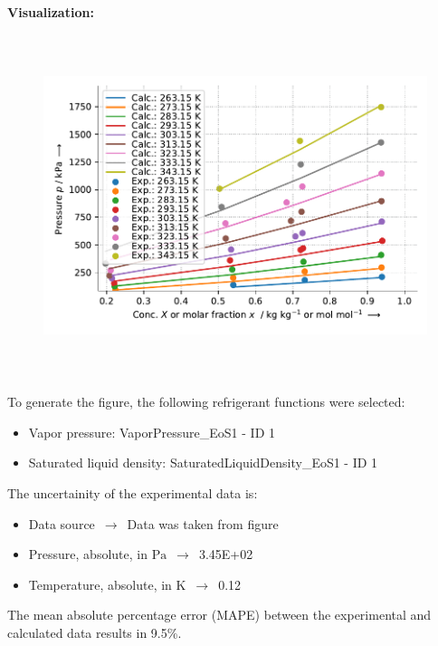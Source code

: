 \textbf{Visualization:}
%
\begin{figure}[!htp]
{\noindent\includegraphics[height=10cm, keepaspectratio]{figs/abs/abs_R-12_naphthenic__NrtlFixedDg_1.pdf}}
\end{figure}
%

To generate the figure, the following refrigerant functions were selected:
\begin{itemize}
\item Vapor pressure: VaporPressure\_EoS1 - ID 1
\item Saturated liquid density: SaturatedLiquidDensity\_EoS1 - ID 1
\end{itemize}

The uncertainity of the experimental data is:
\begin{itemize}
\item Data source $\,\to\,$ Data was taken from figure
\item Pressure, absolute, in $\si{\pascal}$ $\,\to\,$ 3.45E+02
\item Temperature, absolute, in $\si{\kelvin}$ $\,\to\,$ 0.12
\end{itemize}

The mean absolute percentage error (MAPE) between the experimental and calculated data results in 9.5\%.
\FloatBarrier
\newpage
